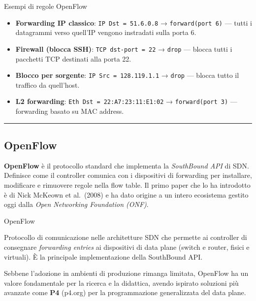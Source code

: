 \documentclass[
  italian,
  openany]{book}
\providecommand{\tightlist}{%
  \setlength{\itemsep}{0pt}\setlength{\parskip}{0pt}}
\begin{document}
\begin{callouttip}{Esempi di regole OpenFlow}

\begin{itemize}
\tightlist
\item
  \textbf{Forwarding IP classico}: \texttt{IP\ Dst\ =\ 51.6.0.8} →
  \texttt{forward(port\ 6)} --- tutti i datagrammi verso quell'IP
  vengono instradati sulla porta 6.
\item
  \textbf{Firewall (blocca SSH)}: \texttt{TCP\ dst-port\ =\ 22} →
  \texttt{drop} --- blocca tutti i pacchetti TCP destinati alla porta
  22.
\item
  \textbf{Blocco per sorgente}: \texttt{IP\ Src\ =\ 128.119.1.1} →
  \texttt{drop} --- blocca tutto il traffico da quell'host.
\item
  \textbf{L2 forwarding}: \texttt{Eth\ Dst\ =\ 22:A7:23:11:E1:02} →
  \texttt{forward(port\ 3)} --- forwarding basato su MAC address.
\end{itemize}

\end{callouttip}

\begin{center}\rule{0.5\linewidth}{0.5pt}\end{center}

\subsection{OpenFlow}\label{openflow}

\textbf{OpenFlow} è il protocollo standard che implementa la
\emph{SouthBound API} di SDN. Definisce come il controller comunica con
i dispositivi di forwarding per installare, modificare e rimuovere
regole nella flow table. Il primo paper che lo ha introdotto è di Nick
McKeown et al.~(2008) e ha dato origine a un intero ecosistema gestito
oggi dalla \emph{Open Networking Foundation (ONF)}.

\begin{calloutdefinition}{OpenFlow}

Protocollo di comunicazione nelle architetture SDN che permette ai
controller di consegnare \emph{forwarding entries} ai dispositivi di
data plane (switch e router, fisici e virtuali). È la principale
implementazione della SouthBound API.

\end{calloutdefinition}

Sebbene l'adozione in ambienti di produzione rimanga limitata, OpenFlow
ha un valore fondamentale per la ricerca e la didattica, avendo ispirato
soluzioni più avanzate come \textbf{P4} (p4.org) per la programmazione
generalizzata del data plane.
\end{document}

